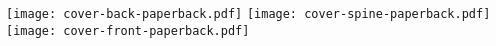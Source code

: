 \documentclass[border=0pt]{standalone}
\begin{document}
%
\noindent%
%
  \texttt{[image: cover-back-paperback.pdf]}%
  \texttt{[image: cover-spine-paperback.pdf]}%
  \texttt{[image: cover-front-paperback.pdf]}%
\end{document}
